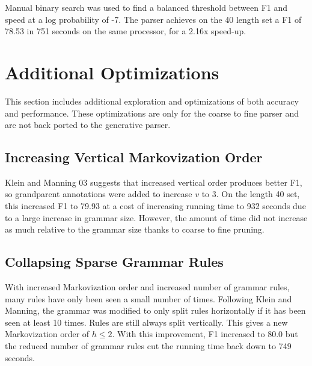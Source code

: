 \documentclass[11pt]{article}
\begin{document}
Manual binary search was used to find a balanced threshold between F1 and speed at a log
probability of -7.
The parser achieves on the 40 length set a F1 of 78.53 in 751 seconds on the same processor,
for a 2.16x speed-up.

\section{Additional Optimizations}
This section includes additional exploration and optimizations of both accuracy and performance.
These optimizations are only for the coarse to fine parser and are not back ported to the
generative parser.

\subsection{Increasing Vertical Markovization Order}
Klein and Manning 03 suggests that increased vertical order produces better F1, so grandparent
annotations were added to increase $v$ to 3. On the length 40 set, this increased F1 to 79.93
at a cost of increasing running time to 932 seconds due to a large increase in grammar size.
However, the amount of time did not increase as much relative to the grammar size thanks to
coarse to fine pruning.

\subsection{Collapsing Sparse Grammar Rules}
With increased Markovization order and increased number of grammar rules, many rules have only been
seen a small number of times. Following Klein and Manning, the grammar was modified to only split
rules horizontally if it has been seen at least 10 times. Rules are still always split vertically.
This gives a new Markovization order of $h\leq 2$. With this improvement, F1 increased to 80.0
but the reduced number of grammar rules cut the running time back down to 749 seconds.
\end{document}
